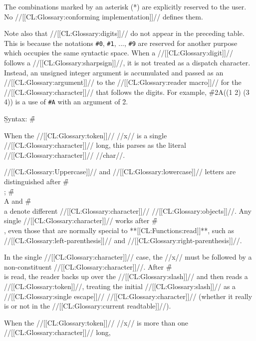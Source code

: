 The combinations marked by an asterisk (*) are explicitly reserved to the user.  No //[[CL:Glossary:conforming implementation]]// defines them.

Note also that //[[CL:Glossary:digits]]// do not appear in the preceding table.  This is because the notations {\tt \#0}, {\tt \#1}, ..., {\tt \#9} are reserved for another purpose which occupies the same syntactic space. When a //[[CL:Glossary:digit]]// follows a //[[CL:Glossary:sharpsign]]//, it is not treated as a dispatch character. Instead, an unsigned integer argument is accumulated  and passed as an //[[CL:Glossary:argument]]// to the //[[CL:Glossary:reader macro]]//  for the //[[CL:Glossary:character]]// that follows the digits. For example, \f{\#2A((1 2) (3 4))} is a use of {\tt \#A} with an argument of \f{2}.

  

\b{Syntax:} \f{\#\\}

When the //[[CL:Glossary:token]]// //x// is a single //[[CL:Glossary:character]]// long,  this parses as the literal //[[CL:Glossary:character]]// //char//.

//[[CL:Glossary:Uppercase]]// and //[[CL:Glossary:lowercase]]// letters are distinguished after \f{\#\\}; \f{\#\\A} and \f{\#\\a} denote different //[[CL:Glossary:character]]// //[[CL:Glossary:objects]]//. Any single //[[CL:Glossary:character]]// works after \f{\#\\}, even those that are normally special to **[[CL:Functions:read]]**,  such as //[[CL:Glossary:left-parenthesis]]// and //[[CL:Glossary:right-parenthesis]]//.

In the single //[[CL:Glossary:character]]// case, the //x// must be followed by a non-constituent //[[CL:Glossary:character]]//. After \f{\#\\} is read, the reader backs up over the //[[CL:Glossary:slash]]// and then reads a //[[CL:Glossary:token]]//, treating the initial //[[CL:Glossary:slash]]// as a //[[CL:Glossary:single escape]]// //[[CL:Glossary:character]]// (whether it really is or not in the //[[CL:Glossary:current readtable]]//).

When the //[[CL:Glossary:token]]// //x// is more than one //[[CL:Glossary:character]]// long,

